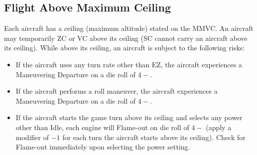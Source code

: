 \begin{advancedrules}
\section{Flight Above Maximum Ceiling}

Each aircraft has a ceiling (maximum altitude) stated on the MMVC. An aircraft may temporarily ZC or VC above its ceiling (SC cannot carry an aircraft above its ceiling). While above its ceiling, an aircraft is subject to the following risks:

\begin{itemize}

    \item If the aircraft uses any turn rate other than EZ, the aircraft experiences a Maneuvering Departure on a die roll of $4-$.
    
    \item If the aircraft performs a roll maneuver, the aircraft experiences a Maneuvering Departure on a die roll of $4-$.

    \item If the aircraft starts the game turn above its ceiling and selects any power other than Idle, each engine will Flame-out on die roll of $4-$ (apply a modifier of $-1$ for each turn the aircraft starts above its ceiling). Check for Flame-out immediately upon selecting the power setting.

\end{itemize}


\end{advancedrules}
